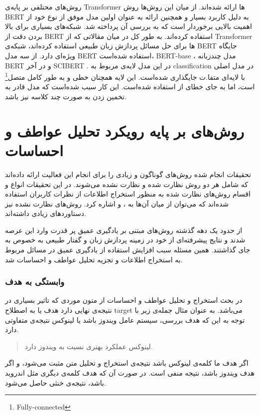 \documentclass[12pt, a4paper, oneside]{report}
\begin{document}
روش‌های محتلفی بر پایه‌ی
Transformer
ها ارائه شده‌اند. از میان این روش‌ها روش
BERT
به دلیل کاربرد بسیار و همچنین ارائه به عنوان اولین مدل موفق از نوع خود از اهمیت بالایی برخوردار است که به بررسی آن
پرداخته شد. شبکه‌های بسیاری برای بالا بردن دقت از
BERT
استفاده کرده‌اند. به طور کل در میان مقالاتی که از
Transformer
ها برای حل مسائل پردازش زبان طبیعی استفاده کرده‌اند، شبکه‌ی
BERT
جایگاه ویژه‌ای دارد.
\cite{schmidt2020data}
از سه مدل
BERT
استفاده شده‌است،
BERT-base
، مدل چندزبانه
BERT
و در آخر
SCIBERT
.
در این مدل لایه‌ی مربوط به
classification
در مدل اصلی با لایه‌ای متفا.ت جایگذاری شده‌است. این لایه همچنان خطی و
به طور کامل متصل\footnote{Fully-connected}
است، اما به جای خطای
از
استفاده شده‌است. این کار سبب شده‌است که مدل قادر به تخمین زدن به صورت چند کلاسه نیز باشد.

\section{روش‌های بر پایه رویکرد تحلیل عواطف و احساسات}

تحقیقات انجام شده روش‌های گوناگون و زیادی را برای انجام این فعالیت ارائه داده‌اند که شامل هر دو روش
نظارت شده و نظارت نشده می‌شوند.
در این تحقیقات انواع و اقسام روش‌های نظارت شده به منظور استخراج اطلاعات از نظرات کاربران
استفاده شده‌اند که می‌توان از میان آن‌ها به
،
و
اشاره کرد.
روش‌های نظارت نشده نیز دستاورد‌های زیادی داشته‌اند.

از حدود یک دهه گذشته روش‌های مبتنی بر یادگیری عمیق پر قدرت وارد این عرصه شدند و نتایج پیشرفته‌ای
از خود در زمینه پردازش زبان و گفتار طبیعی به خصوص
به جای گذاشتند.
همین مسئله سبب افزایش استفاده از یادگیری عمیق در مسائل مربوط به استخراج اطلاعات و تجزیه تحلیل
عواطف و احساسات شد.
\cite{zhang2018deep}


\subsubsection{وابستگی به هدف}
در بحث استخراج و تحلیل عواطف و احساسات از متون موردی که تاثیر بسیاری در نتیجه‌ی نهایی دارد هدف یا به اصطلاح
target
می‌باشد. به عنوان مثال جمله‌ی زیر با توجه به این که هدف بررسی، سیستم عامل ویندوز باشد یا لینوکس نتیجه‌ی متفاوتی دارد.
\begin{quotation}
    لینوکس عملکرد بهتری نسبت به ویندوز دارد.
\end{quotation}
اگر هدف ما کلمه‌ی لینوکس باشد نتیجه‌ی استخراج و تحلیل متن مثبت می‌شود، و اگر هدف ویندوز باشد، نتیجه منفی است.
در صورت آن که هدف کلمه‌ی دیگری مثل اندروید باشد، نتیجه‌ی خنثی حاصل می‌شود.
\end{document}
